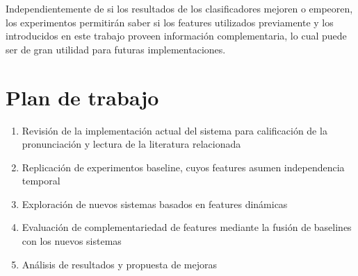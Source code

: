\documentclass[a4paper,12pt]{article} %
\begin{document}
Independientemente de si los resultados de los clasificadores mejoren o empeoren, los
experimentos permitirán saber si los features utilizados previamente y los introducidos
en este trabajo proveen información complementaria, lo cual puede ser de gran utilidad
para futuras implementaciones.


\section{Plan de trabajo}

\begin{enumerate}
	\item Revisi\'on de la implementaci\'on actual del sistema para calificación de la pronunciación y lectura de la literatura relacionada
	\item Replicaci\'on de experimentos baseline, cuyos features asumen independencia temporal
	\item Exploraci\'on de nuevos sistemas basados en features din\'amicas
	\item Evaluaci\'on de complementariedad de features mediante la fusi\'on de baselines con los nuevos sistemas
	\item An\'alisis de resultados y propuesta de mejoras
\end{enumerate}

\newpage
\printbibliography
\end{document}
